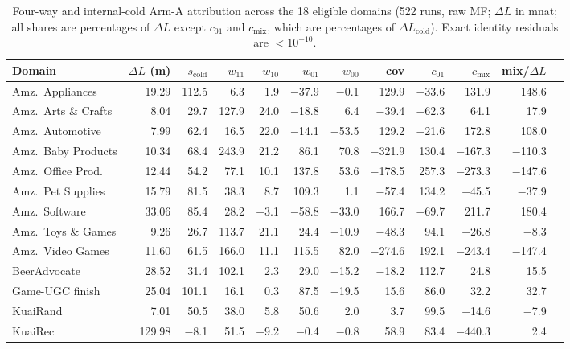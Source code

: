 \documentclass[10pt,letterpaper]{article}
\begin{document}
\begin{table}[t]
\centering
\caption{Four-way and internal-cold Arm-A attribution across the 18 eligible
domains (522 runs, raw MF; $\Delta L$ in mnat; all shares are percentages of
$\Delta L$ except $c_{01}$ and $c_{\mathrm{mix}}$, which are percentages of
$\Delta L_{\mathrm{cold}}$). Exact identity residuals are $< 10^{-10}$.}
\label{tab:fourway18}
\scriptsize
\setlength{\tabcolsep}{3.5pt}
\begin{tabular}{lrrrrrrrrrrr}
\toprule
Domain & $\Delta L$ (m) & $s_{\mathrm{cold}}$ & $w_{11}$ & $w_{10}$ & $w_{01}$ & $w_{00}$ & cov & $c_{01}$ & $c_{\mathrm{mix}}$ & mix/$\Delta L$ \\
\midrule
Amz.\ Appliances    & 19.29 & 112.5 &   6.3 &   1.9 & $-$37.9 &  $-$0.1 &  129.9 & $-$33.6 &  131.9 &  148.6 \\
Amz.\ Arts \& Crafts & 8.04 &  29.7 & 127.9 &  24.0 & $-$18.8 &     6.4 & $-$39.4 & $-$62.3 &   64.1 &   17.9 \\
Amz.\ Automotive    &  7.99 &  62.4 &  16.5 &  22.0 & $-$14.1 & $-$53.5 &  129.2 & $-$21.6 &  172.8 &  108.0 \\
Amz.\ Baby Products & 10.34 &  68.4 & 243.9 &  21.2 &    86.1 &    70.8 & $-$321.9 & 130.4 & $-$167.3 & $-$110.3 \\
Amz.\ Office Prod.  & 12.44 &  54.2 &  77.1 &  10.1 &   137.8 &    53.6 & $-$178.5 & 257.3 & $-$273.3 & $-$147.6 \\
Amz.\ Pet Supplies  & 15.79 &  81.5 &  38.3 &   8.7 &   109.3 &     1.1 & $-$57.4 & 134.2 &  $-$45.5 &  $-$37.9 \\
Amz.\ Software      & 33.06 &  85.4 &  28.2 & $-$3.1 & $-$58.8 & $-$33.0 &  166.7 & $-$69.7 &  211.7 &  180.4 \\
Amz.\ Toys \& Games &  9.26 &  26.7 & 113.7 &  21.1 &    24.4 & $-$10.9 & $-$48.3 &  94.1 &  $-$26.8 &   $-$8.3 \\
Amz.\ Video Games   & 11.60 &  61.5 & 166.0 &  11.1 &   115.5 &    82.0 & $-$274.6 & 192.1 & $-$243.4 & $-$147.4 \\
BeerAdvocate        & 28.52 &  31.4 & 102.1 &   2.3 &    29.0 & $-$15.2 & $-$18.2 & 112.7 &   24.8 &   15.5 \\
Game-UGC finish     & 25.04 & 101.1 &  16.1 &   0.3 &    87.5 & $-$19.5 &   15.6 &  86.0 &   32.2 &   32.7 \\
KuaiRand            &  7.01 &  50.5 &  38.0 &   5.8 &    50.6 &     2.0 &    3.7 &  99.5 &  $-$14.6 &   $-$7.9 \\
KuaiRec             & 129.98 & $-$8.1 & 51.5 & $-$9.2 & $-$0.4 & $-$0.8 &   58.9 &  83.4 & $-$440.3 &    2.4 \\

\end{tabular}
\end{table}
\end{document}
